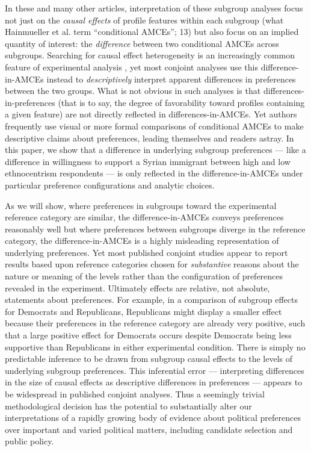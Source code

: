 \documentclass[a4paper,12pt]{article}\usepackage[]{graphicx}\usepackage[]{color}
\begin{document}
In these and many other articles, interpretation of these subgroup analyses focus not just on the \textit{causal effects} of profile features within each subgroup (what Hainmueller et al. term ``conditional AMCEs''; 13) but also focus on an implied quantity of interest: the \textit{difference} between two conditional AMCEs across subgroups. Searching for causal effect heterogeneity is an increasingly common feature of experimental analysis \citep{GreenKern2012, RatkovicTingley2017, GrimmerMessingWestwood2017}, yet most conjoint analyses use this difference-in-AMCEs instead to \textit{descriptively} interpret apparent differences in preferences between the two groups. What is not obvious in such analyses is that differences-in-preferences (that is to say, the degree of favorability toward profiles containing a given feature) are not directly reflected in differences-in-AMCEs. Yet authors frequently use visual or more formal comparisons of conditional AMCEs to make descriptive claims about preferences, leading themselves and readers astray. In this paper, we show that a difference in underlying subgroup preferences --- like a difference in willingness to support a Syrian immigrant between high and low ethnocentrism respondents --- is only reflected in the difference-in-AMCEs under particular preference configurations and analytic choices.

As we will show, where preferences in subgroups toward the experimental reference category are similar, the difference-in-AMCEs conveys preferences reasonably well but where preferences between subgroups diverge in the reference category, the difference-in-AMCEs is a highly misleading representation of underlying preferences. Yet most published conjoint studies appear to report results based upon reference categories chosen for \textit{substantive} reasons about the nature or meaning of the levels rather than the configuration of preferences revealed in the experiment. Ultimately effects are relative, not absolute, statements about preferences. For example, in a comparison of subgroup effects for Democrats and Republicans, Republicans might display a smaller effect because their preferences in the reference category are already very positive, such that a large positive effect for Democrats occurs despite Democrats being less supportive than Republicans in either experimental condition. There is simply no predictable inference to be drawn from subgroup causal effects to the levels of underlying subgroup preferences. This inferential error --- interpreting differences in the size of causal effects as descriptive differences in preferences --- appears to be widespread in published conjoint analyses. Thus a seemingly trivial methodological decision has the potential to substantially alter our interpretations of a rapidly growing body of evidence about political preferences over important and varied political matters, including candidate selection and public policy.
\end{document}
